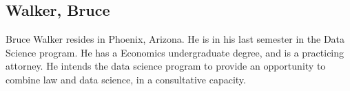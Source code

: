 \subsection{Walker, Bruce}

Bruce Walker resides in Phoenix, Arizona.  He is in his last semester in the Data Science program.  He has a Economics undergraduate degree, and is a practicing attorney.  He intends the data science program to provide an opportunity to combine law and data science, in a consultative capacity. 
